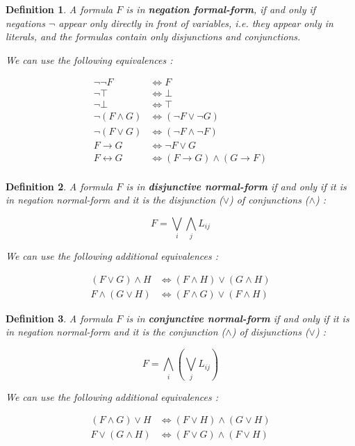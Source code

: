 \documentclass[a4paper,11pt]{report}
\newtheorem*{mydef}{Definition}
\begin{document}
\begin{mydef}
  A formula $F$ is in \textbf{negation formal-form}, if and only if negations
  $\neg$ appear only directly in front of variables, i.e. they appear only in
  literals, and the formulas contain only disjunctions and conjunctions.

  We can use the following equivalences :

  \begin{align*}
    \neg \neg F &\Leftrightarrow F\\
    \neg \top &\Leftrightarrow \bot\\
    \neg \bot &\Leftrightarrow \top\\
    \neg (F \wedge G)&\Leftrightarrow (\neg F \vee \neg G)\\
    \neg (F \vee G)&\Leftrightarrow (\neg F \wedge \neg F)\\
    F \to G &\Leftrightarrow \neg F \vee G\\
    F \leftrightarrow G &\Leftrightarrow (F \to G) \wedge (G \to F)\\
  \end{align*}
\end{mydef}

\begin{mydef}
  A formula $F$ is in \textbf{disjunctive normal-form} if and only if it is in
  negation normal-form and it is the disjunction ($\vee$) of conjunctions
  ($\wedge$) :

  $$ F = \bigvee_i \bigwedge_j L_{ij}$$

  We can use the following additional equivalences :

  \begin{align*}
    (F \vee G) \wedge H &\Leftrightarrow (F \wedge H) \vee (G \wedge H) \\
    F \wedge (G \vee H) &\Leftrightarrow (F \wedge G) \vee (F \wedge H)
  \end{align*}
\end{mydef}

\begin{mydef}
   A formula $F$ is in \textbf{conjunctive normal-form} if and only if it is in
  negation normal-form and it is the conjunction ($\wedge$) of disjunctions
  ($\vee$) :

  $$ F = \bigwedge_i (\bigvee_j L_{ij})$$

  We can use the following additional equivalences :

  \begin{align*}
    (F \wedge G) \vee H &\Leftrightarrow (F \vee H) \wedge (G \vee H) \\
    F \vee (G \wedge H) &\Leftrightarrow (F \vee G) \wedge (F \vee H)
  \end{align*} 
\end{mydef}
\end{document}
